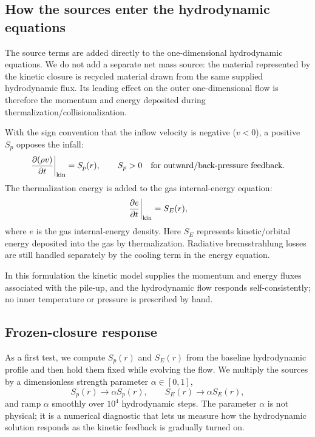 \documentclass[12pt]{article}
\begin{document}
\subsection{How the sources enter the hydrodynamic equations}

The source terms are added directly to the one-dimensional hydrodynamic
equations. We do not add a separate net mass source: the material
represented by the kinetic closure is recycled material drawn from the
same supplied hydrodynamic flux. Its leading effect on the outer
one-dimensional flow is therefore the momentum and energy deposited
during thermalization/collisionalization.

With the sign convention that the inflow velocity is negative ($v<0$),
a positive $S_p$ opposes the infall:
\begin{equation}
  \left.\frac{\partial(\rho v)}{\partial t}\right|_{\rm kin}
  =
  S_p(r),
  \qquad
  S_p>0 \quad \hbox{for outward/back-pressure feedback}.
\end{equation}
The thermalization energy is added to the gas internal-energy equation:
\begin{equation}
  \left.\frac{\partial e}{\partial t}\right|_{\rm kin}
  =
  S_E(r),
\end{equation}
where $e$ is the gas internal-energy density. Here $S_E$ represents
kinetic/orbital energy deposited into the gas by thermalization.
Radiative bremsstrahlung losses are still handled separately by the
cooling term in the energy equation.

In this formulation the kinetic model supplies the momentum and energy
fluxes associated with the pile-up, and the hydrodynamic flow responds
self-consistently; no inner temperature or pressure is prescribed by
hand.

\subsection{Frozen-closure response}

As a first test, we compute $S_p(r)$ and $S_E(r)$ from the baseline
hydrodynamic profile and then hold them fixed while evolving the flow.
We multiply the sources by a dimensionless strength parameter
$\alpha \in [0,1]$,
\begin{equation}
  S_p(r) \rightarrow \alpha S_p(r),
  \qquad
  S_E(r) \rightarrow \alpha S_E(r),
\end{equation}
and ramp $\alpha$ smoothly over $10^4$ hydrodynamic steps. The parameter
$\alpha$ is not physical; it is a numerical diagnostic that lets us
measure how the hydrodynamic solution responds as the kinetic feedback
is gradually turned on.
\end{document}
